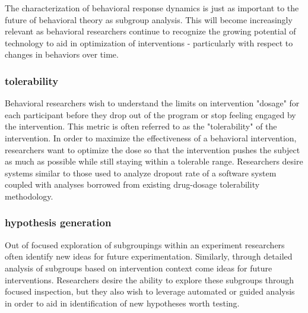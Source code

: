 The characterization of behavioral response dynamics is just as important to the future of behavioral theory as subgroup analysis.
This will become increasingly relevant as behavioral researchers continue to recognize the growing potential of technology to aid in optimization of interventions - particularly with respect to changes in behaviors over time. 

\subsubsection{tolerability} 
Behavioral researchers wish to understand the limits on intervention "dosage" for each participant before they drop out of the program or stop feeling engaged by the intervention.
This metric is often referred to as the "tolerability" of the intervention.
In order to maximize the effectiveness of a behavioral intervention, researchers want to optimize the dose so that the intervention pushes the subject as much as possible while still staying within a tolerable range.
Researchers desire systems similar to those used to analyze dropout rate of a software system coupled with analyses borrowed from existing drug-dosage tolerability methodology.


\subsubsection{hypothesis generation}
Out of focused exploration of subgroupings within an experiment researchers often identify new ideas for future experimentation.
Similarly, through detailed analysis of subgroups based on intervention context come ideas for future interventions.
Researchers desire the ability to explore these subgroups through focused inspection, but they also wish to leverage automated or guided analysis in order to aid in identification of new hypotheses worth testing.

